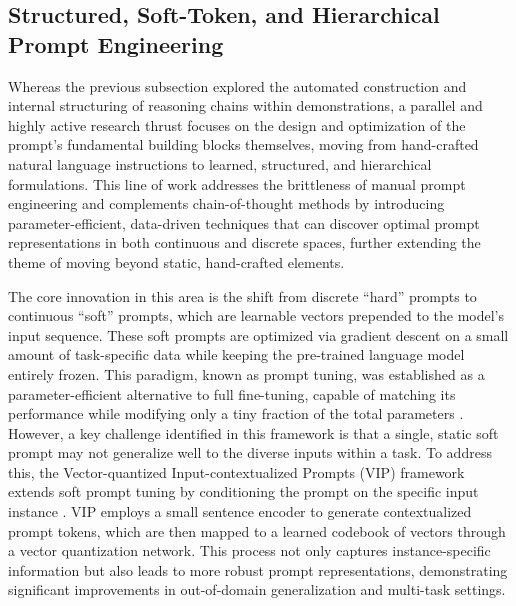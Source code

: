 \documentclass[11pt]{article}
\begin{document}
\subsection{Structured, Soft-Token, and Hierarchical Prompt Engineering}

Whereas the previous subsection explored the automated construction and internal structuring of reasoning chains within demonstrations, a parallel and highly active research thrust focuses on the design and optimization of the prompt's fundamental building blocks themselves, moving from hand-crafted natural language instructions to learned, structured, and hierarchical formulations. This line of work addresses the brittleness of manual prompt engineering and complements chain-of-thought methods by introducing parameter-efficient, data-driven techniques that can discover optimal prompt representations in both continuous and discrete spaces, further extending the theme of moving beyond static, hand-crafted elements.

The core innovation in this area is the shift from discrete ``hard'' prompts to continuous ``soft'' prompts, which are learnable vectors prepended to the model's input sequence. These soft prompts are optimized via gradient descent on a small amount of task-specific data while keeping the pre-trained language model entirely frozen. This paradigm, known as prompt tuning, was established as a parameter-efficient alternative to full fine-tuning, capable of matching its performance while modifying only a tiny fraction of the total parameters \cite{ref154}. However, a key challenge identified in this framework is that a single, static soft prompt may not generalize well to the diverse inputs within a task. To address this, the Vector-quantized Input-contextualized Prompts (VIP) framework extends soft prompt tuning by conditioning the prompt on the specific input instance \cite{ref155}. VIP employs a small sentence encoder to generate contextualized prompt tokens, which are then mapped to a learned codebook of vectors through a vector quantization network. This process not only captures instance-specific information but also leads to more robust prompt representations, demonstrating significant improvements in out-of-domain generalization and multi-task settings.
\end{document}
